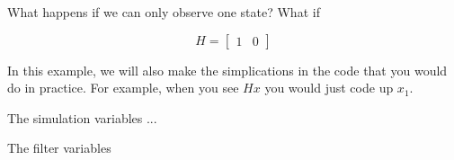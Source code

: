 What happens if we can only observe one state? What if

\[H = \begin{bmatrix} 1& 0  \end{bmatrix}\]

In this example, we will also make the simplications in the code that
you would do in practice. For example, when you see \(Hx\) you would
just code up \(x_1\).

\begin{Shaded}
\begin{Highlighting}[]
 \OperatorTok{,}
\OperatorTok{,}
\end{Highlighting}
\end{Shaded}

The simulation variables ...

\begin{Shaded}
\begin{Highlighting}[]
\OperatorTok{=} 
\OperatorTok{=}\OperatorTok{,} \OperatorTok{,}\OperatorTok{=}
\OperatorTok{=} \OperatorTok{*}\OperatorTok{*}
\OperatorTok{=} \OperatorTok{*}\OperatorTok{*}
\OperatorTok{=}\NormalTok{ [}\OperatorTok{,} \NormalTok{]}
\OperatorTok{=} 
\OperatorTok{=}\OperatorTok{,}
\OperatorTok{=}
\OperatorTok{=} \NormalTok{[} \OperatorTok{{-}}\OperatorTok{;}  \NormalTok{]}
\OperatorTok{=}
\OperatorTok{=}\NormalTok{[u1 u2}\OperatorTok{;}\NormalTok{])}
\end{Highlighting}
\end{Shaded}

The filter variables

\begin{Shaded}
\begin{Highlighting}[]
\OperatorTok{=} \NormalTok{[} \OperatorTok{;}  \NormalTok{]}
\OperatorTok{=} 
\OperatorTok{=}\OperatorTok{,}\NormalTok{)}
\OperatorTok{=}\OperatorTok{,}
\end{Highlighting}
\end{Shaded}

